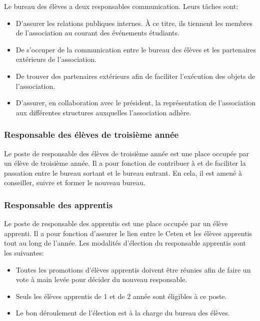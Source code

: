 \documentclass{article} %
\begin{document}
				Le bureau des élèves a deux responsables communication. Leurs
				tâches sont:
				\begin{itemize}
					\item D’assurer les relations publiques internes. À ce
						titre, ils tiennent les membres de l’association au
						courant des événements étudiants.
					\item De s’occuper de la communication entre le bureau des
						élèves et les partenaires extérieurs de l’association.
					\item De trouver des partenaires extérieurs afin de
						faciliter l’exécution des objets de l’association.
					\item D’assurer, en collaboration avec le président, la
						représentation de l’association aux différentes
						structures auxquelles l’association adhère. 
				\end{itemize}

			\subsubsection{Responsable des élèves de troisième année}
\label{ssub:responsable_des_eleves_de_troisieme_annee}

				Le poste de responsable des élèves de troisième année est une
				place occupée par un élève de troisième année. Il a pour
				fonction de contribuer à et de faciliter la passation entre le bureau sortant et le
				bureau entrant. En cela, il est amené à conseiller, suivre et
				former le nouveau bureau.

			\subsubsection{Responsable des apprentis}
\label{ssub:responsable_des_apprentis}

				Le poste de responsable des apprentis est une place occupée par
				un élève apprenti. Il a pour fonction d’assurer le lien entre le
				Ceten et les élèves apprentis tout au long de l’année. Les
				modalités d’élection du responsable apprentis sont les
				suivantes:
				\begin{itemize}
					\item Toutes les promotions d’élèves apprentis doivent être
						réunies afin de faire un vote à main levée pour décider
						du nouveau responsable.
					\item Seuls les élèves apprentis de 1 et de
						2 année sont éligibles à ce poste.
					\item Le bon déroulement de l’élection est à la charge du
						bureau des élèves.
				\end{itemize}
\end{document}
